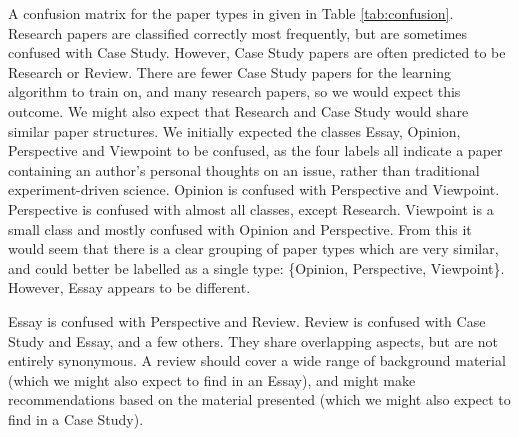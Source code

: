 \documentclass{svmult}
\begin{document}
A confusion matrix for the paper types in given in Table \ref{tab:confusion}.
Research papers are classified correctly most frequently, but are sometimes
confused with Case Study. However, Case Study papers are often predicted to be
Research or Review. There are fewer Case Study papers for the learning
algorithm to train on, and many research papers, so we would expect this
outcome. We might also expect that Research and Case Study would share similar
paper structures.  We initially expected the classes Essay, Opinion,
Perspective and Viewpoint to be confused, as the four labels all indicate a
paper containing an author's personal thoughts on an issue, rather than
traditional experiment-driven science. Opinion is confused with Perspective and
Viewpoint. Perspective is confused with almost all classes, except Research.
Viewpoint is a small class and mostly confused with Opinion and Perspective.
From this it would seem that there is a clear grouping of paper types which are
very similar, and could better be labelled as a single type: \{Opinion,
Perspective, Viewpoint\}. However, Essay appears to be different.

Essay is confused with Perspective and Review. Review is confused with Case Study and Essay, and a few others. They share overlapping aspects, but are not entirely synonymous. A review should cover a wide range of background material (which we might also expect to find in an Essay), and might make recommendations based on the material presented (which we might also expect to find in a Case Study). 
\end{document}
